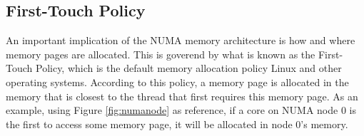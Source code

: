 \subsection{First-Touch Policy}
\label{sec:firstouch}
An important implication of the NUMA memory architecture is how and where memory pages are allocated. This is goverend by what is known as the First-Touch Policy, which is the default memory allocation policy Linux and other operating systems. According to this policy, a memory page is allocated in the memory that is closest to the thread that first requires this memory page. As an example, using Figure \ref{fig:numanode} as reference, if a core on NUMA node 0 is the first to access some memory page, it will be allocated in node 0's memory.


 


